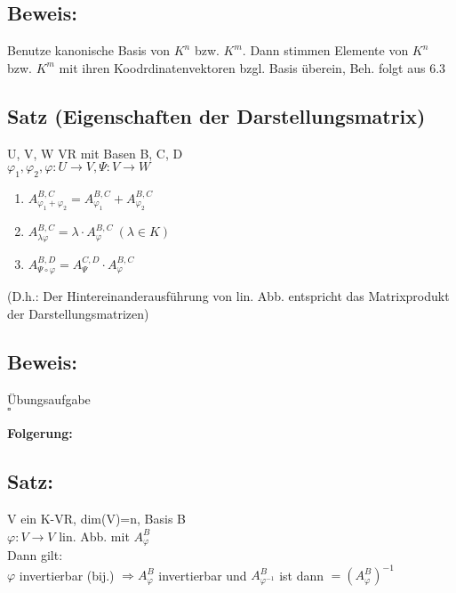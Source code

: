 \subsection*{Beweis:}
Benutze kanonische Basis von $K^n$ bzw. $K^m$. Dann stimmen Elemente von $K^n$ bzw. $K^m$ mit ihren Koodrdinatenvektoren bzgl. Basis überein, Beh. folgt aus 6.3

\subsection{Satz (Eigenschaften der Darstellungsmatrix)}
U, V, W VR mit Basen B, C, D\\
$\varphi_1,\varphi_2,\varphi: U\rightarrow V, \Psi: V\rightarrow W$
\begin{enumerate}
	\item
	$A_{\varphi_1+\varphi_2}^{B,C} = A_{\varphi_1}^{B,C} + A_{\varphi_2}^{B,C}$
	
	\item
	$A_{\lambda \varphi}^{B,C} = \lambda\cdot A_{\varphi}^{B,C} \ (\lambda\in K)$
	
	\item
	$A_{\Psi \circ\varphi}^{B,D} = A_{\Psi}^{C,D}\cdot A_{\varphi}^{B,C}$
\end{enumerate}
(D.h.: Der Hintereinanderausführung von lin. Abb. entspricht das Matrixprodukt der Darstellungsmatrizen)

\subsection*{Beweis:}
Übungsaufgabe\\
\hspace*{13cm}$\square$


\textbf{Folgerung:}
\subsection{Satz:}
V ein K-VR, dim(V)=n, Basis B\\
$\varphi: V\rightarrow V$ lin. Abb. mit $A_{\varphi}^B$\\
Dann gilt:\\
$\varphi$ invertierbar (bij.) $\Rightarrow A_{\varphi}^B$ invertierbar und $A_{\varphi^{-1}}^B$ ist dann $=(A_{\varphi}^B)^{-1}$

